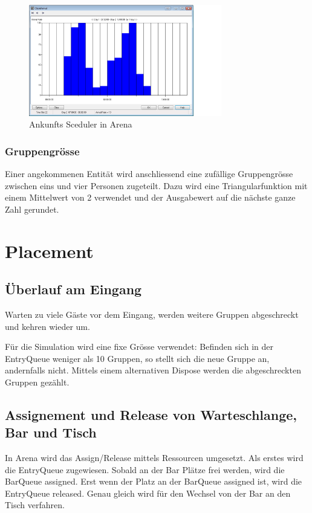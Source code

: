 \documentclass[ngerman,a4paper,12pt]{scrreprt}
\begin{document}
			\begin{figure}[H]
				\centering
					\includegraphics[width=0.75\textwidth]{img/scheduler.png}
					\caption[Arrival Sceduler in Arena]{Ankunfts Sceduler in Arena}
					\label{arrivalSceduler}
			\end{figure}
	
			\subsubsection{Gruppengrösse}
			Einer angekommenen Entität wird anschliessend eine zufällige Gruppengrösse zwischen eins und vier Personen zugeteilt. Dazu wird eine Triangularfunktion mit einem Mittelwert von 2 verwendet und der Ausgabewert auf die nächste ganze Zahl gerundet.
			
	
	\section{Placement}		
		\subsection{Überlauf am Eingang}
			Warten zu viele Gäste vor dem Eingang, werden weitere Gruppen abgeschreckt und kehren wieder um.
		
			Für die Simulation wird eine fixe Grösse verwendet: 			Befinden sich in der EntryQueue weniger als 10 Gruppen, so stellt sich die neue Gruppe an, andernfalls nicht. Mittels einem alternativen Dispose werden die abgeschreckten Gruppen gezählt.
			
			
		\subsection{Assignement und Release von Warteschlange, Bar und Tisch}
			In Arena wird das Assign/Release mittels Ressourcen umgesetzt. Als erstes wird die EntryQueue zugewiesen. Sobald an der Bar Plätze frei werden, wird die BarQueue assigned. Erst wenn der Platz an der BarQueue assigned ist, wird die EntryQueue released. Genau gleich wird für den Wechsel von der Bar an den Tisch verfahren.
	
\end{document}
